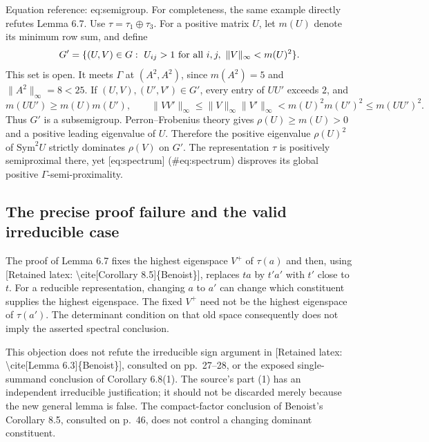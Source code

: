 \documentclass[10pt]{article}
\begin{document}
Equation reference: eq:semigroup. For completeness, the same example directly refutes Lemma 6.7. Use \(\tau=\tau_1\oplus\tau_3\). For a positive matrix \(U\), let \(m(U)\) denote its minimum row sum, and define \[
 G'=\{(U,V)\in G:\ U_{ij}>1\ \hbox{for all }i,j,\
                  \|V\|_\infty<m(U)^2\}.\] This set is open. It meets \(\Gamma\) at \((A^2,A^2)\), since \(m(A^2)=5\) and \(\|A^2\|_\infty=8<25\). If \((U,V),(U',V')\in G'\), every entry of \(UU'\) exceeds \(2\), and \[m(UU')\geq m(U)m(U'),\qquad
 \|VV'\|_\infty\leq\|V\|_\infty\|V'\|_\infty
       <m(U)^2m(U')^2\leq m(UU')^2.\] Thus \(G'\) is a subsemigroup. Perron–Frobenius theory gives \(\rho(U)\geq m(U)>0\) and a positive leading eigenvalue of \(U\). Therefore the positive eigenvalue \(\rho(U)^2\) of \(\mathrm{Sym}^2U\) strictly dominates \(\rho(V)\) on \(G'\). The representation \(\tau\) is positively semiproximal there, yet [eq:spectrum] (\#eq:spectrum) disproves its global positive \(\Gamma\)-semi-proximality.\par
\subsection*{The precise proof failure and the valid irreducible case}
The proof of Lemma 6.7 fixes the highest eigenspace \(V^+\) of \(\tau(a)\) and then, using [Retained latex: \textbackslash{}cite[Corollary 8.5]\{Benoist\}], replaces \(ta\) by \(t'a'\) with \(t'\) close to \(t\). For a reducible representation, changing \(a\) to \(a'\) can change which constituent supplies the highest eigenspace. The fixed \(V^+\) need not be the highest eigenspace of \(\tau(a')\). The determinant condition on that old space consequently does not imply the asserted spectral conclusion.\par
This objection does not refute the irreducible sign argument in [Retained latex: \textbackslash{}cite[Lemma 6.3]\{Benoist\}], consulted on pp. 27–28, or the exposed single-summand conclusion of Corollary 6.8(1). The source’s part (1) has an independent irreducible justification; it should not be discarded merely because the new general lemma is false. The compact-factor conclusion of Benoist’s Corollary 8.5, consulted on p. 46, does not control a changing dominant constituent.\par
\end{document}
